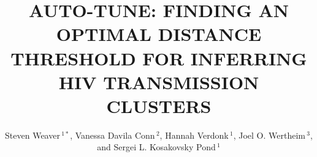 \documentclass[utf8]{FrontiersinHarvard} %
\def\firstAuthorLast{Weaver {et~al.}} %
\def\Authors{Steven Weaver\,$^{1*}$, Vanessa Davila Conn\,$^{2}$, Hannah Verdonk\,$^{1}$, Joel O. Wertheim\,$^{3}$, and Sergei L. Kosakovsky Pond\,$^{1}$}
\begin{document}
\onecolumn
{}

\title { AUTO-TUNE: FINDING AN OPTIMAL DISTANCE THRESHOLD FOR INFERRING HIV TRANSMISSION CLUSTERS } 

\author[\firstAuthorLast ]{\Authors} %
\address{} %
\correspondance{} %

\extraAuth{}%


\maketitle
\end{document}

